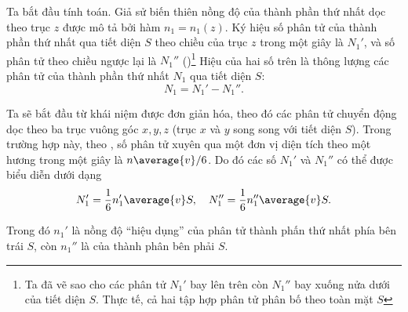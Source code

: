 Ta bắt đầu tính toán. Giả sử biến thiên nồng độ của thành phần thứ nhất dọc theo trục $z$ được mô tả bởi hàm $n_1=n_1(z)$. Ký hiệu số phân tử của thành phần thứ nhất qua tiết diện $S$ theo chiều của trục $z$ trong một giây là $N_1'$, và số phân tử theo chiều ngược lại là $N_1''$ ()\footnote{Ta đã vẽ  sao cho các phân tử $N_1'$ bay lên trên còn $N_1''$ bay xuống nửa dưới của tiết diện $S$. Thực tế, cả hai tập hợp phân tử phân bố theo toàn mặt $S$} Hiệu của hai số trên là thông lượng các phân tử của thành phần thứ nhất $N_1$ qua tiết diện $S$:
\begin{equation}\label{eq:16_13}
    N_1 = N_1' - N_1''.
\end{equation}

Ta sẽ bắt đầu từ khái niệm được đơn giản hóa, theo đó các phân tử chuyển động dọc theo ba trục vuông góc $x, y, z$ (trục $x$ và $y$ song song với tiết diện $S$). Trong trường hợp này, theo , số phân tử xuyên qua một đơn vị diện tích theo một hương trong một giây là $n\average{v}/6$. Do đó các số $N_1'$ và $N_1''$ có thể được biểu diễn dưới dạng
\begin{equation}\label{eq:16_14}
    N_1' = \frac{1}{6}n_1'\average{v} S,\quad N_1'' = \frac{1}{6}n_1''\average{v} S.
\end{equation}

\noindent
Trong đó  $n_1'$ là nồng độ ``hiệu dụng'' của phân tử thành phấn thứ nhất phía bên trái $S$, còn $n_1''$ là của thành phân bên phải $S$.

